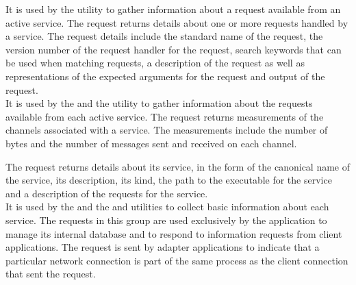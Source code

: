 It is used by the  utility to gather information about a
request available from an active service.
The  request returns details about one or more requests
handled by a service.
The request details include the standard name of the request, the version number of the
request handler for the request, search keywords that can be used when matching requests,
a description of the request as well as representations of the expected arguments for the
request and output of the request.\\

It is used by the  and the
 utility to gather information about the requests available
from each active service.
The  request returns measurements of the channels
associated with a service.
The measurements include the number of bytes and the number of messages sent and
received on each channel.


The  request returns details about its service, in the
form of the canonical name of the service, its description, its kind, the path to the
executable for the service and a description of the requests for the service.\\

It is used by the  and the
 and 
utilities to collect basic information about each service.
\secondaryEnd{}
The requests in this group are used exclusively by the
 application to manage its internal
database and to respond to information requests from client applications.
The  request is sent by
adapter applications to indicate that a particular \yarp{} network connection is part of
the same process as the client connection that sent the request.\\

